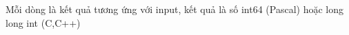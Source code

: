 Mỗi dòng là kết quả tương ứng với input, kết quả là số int64 (Pascal) hoặc long long int (C,C++)  

\